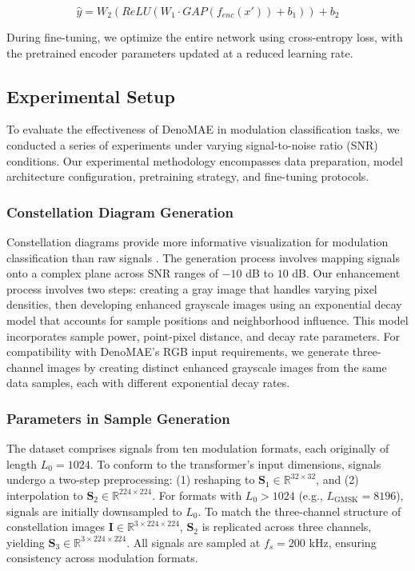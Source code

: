 \begin{equation}
\hat{y} = W_2(ReLU(W_1 \cdot GAP(f_{enc}(x')) + b_1)) + b_2
\end{equation}

During fine-tuning, we optimize the entire network using cross-entropy loss, with the pretrained encoder parameters updated at a reduced learning rate. 

\subsection{Experimental Setup}

To evaluate the effectiveness of DenoMAE in modulation classification tasks, we conducted a series of experiments under varying signal-to-noise ratio (SNR) conditions. Our experimental methodology encompasses data preparation, model architecture configuration, pretraining strategy, and fine-tuning protocols.

\subsubsection{Constellation Diagram Generation}

Constellation diagrams provide more informative visualization for modulation classification than raw signals \cite{doan2020learning}. The generation process involves mapping signals onto a complex plane across SNR ranges of $-10$ dB to $10$ dB. Our enhancement process involves two steps: creating a gray image that handles varying pixel densities, then developing enhanced grayscale images using an exponential decay model that accounts for sample positions and neighborhood influence. This model incorporates sample power, point-pixel distance, and decay rate parameters. For compatibility with DenoMAE's RGB input requirements, we generate three-channel images by creating distinct enhanced grayscale images from the same data samples, each with different exponential decay rates.

\subsubsection{Parameters in Sample Generation} 

The dataset comprises signals from ten modulation formats, each originally of length $L_0 = 1024$. To conform to the transformer's input dimensions, signals undergo a two-step preprocessing: (1) reshaping to $\mathbf{S}_1 \in \mathbb{R}^{32 \times 32}$, and (2) interpolation to $\mathbf{S}_2 \in \mathbb{R}^{224 \times 224}$. For formats with $L_0 > 1024$ (e.g., $L_\text{GMSK} = 8196$), signals are initially downsampled to $L_0$. To match the three-channel structure of constellation images $\mathbf{I} \in \mathbb{R}^{3 \times 224 \times 224}$, $\mathbf{S}_2$ is replicated across three channels, yielding $\mathbf{S}_3 \in \mathbb{R}^{3 \times 224 \times 224}$. All signals are sampled at $f_s = 200$ kHz, ensuring consistency across modulation formats.

